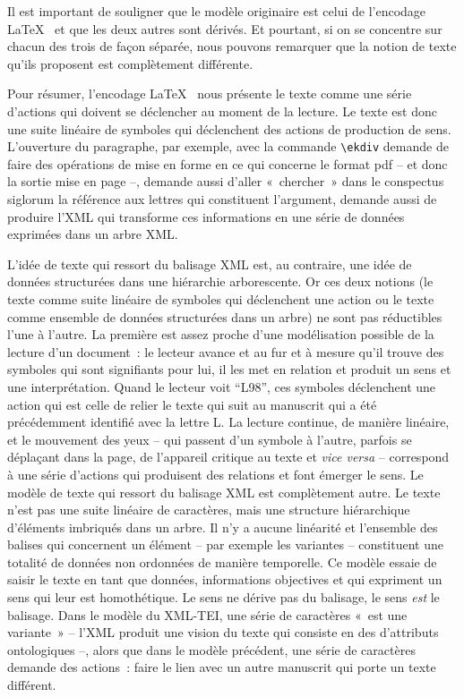 Il est important de souligner que le modèle originaire est celui de
l'encodage \LaTeX~ et que les deux autres sont dérivés. Et pourtant, si
on se concentre sur chacun des trois de façon séparée, nous pouvons
remarquer que la notion de texte qu'ils proposent est complètement
différente.

Pour résumer, l'encodage \LaTeX~ nous présente le texte comme une série
d'actions qui doivent se déclencher au moment de la lecture. Le texte
est donc une suite linéaire de symboles qui déclenchent des actions de
production de sens. L'ouverture du paragraphe, par exemple, avec la
commande \texttt{\textbackslash{}ekdiv} demande de faire des opérations
de mise en forme en ce qui concerne le format pdf -- et donc la sortie
mise en page --, demande aussi d'aller «~chercher~» dans le conspectus
siglorum la référence aux lettres qui constituent l'argument, demande
aussi de produire l'XML qui transforme ces informations en une série de
données exprimées dans un arbre XML.

L'idée de texte qui ressort du balisage XML est, au contraire, une idée
de données structurées dans une hiérarchie arborescente. Or ces deux
notions (le texte comme suite linéaire de symboles qui déclenchent une
action ou le texte comme ensemble de données structurées dans un arbre)
ne sont pas réductibles l'une à l'autre. La première est assez proche
d'une modélisation possible de la lecture d'un document~: le lecteur
avance et au fur et à mesure qu'il trouve des symboles qui sont
signifiants pour lui, il les met en relation et produit un sens et une
interprétation. Quand le lecteur voit ``L98'', ces symboles déclenchent
une action qui est celle de relier le texte qui suit au manuscrit qui a
été précédemment identifié avec la lettre L. La lecture continue, de
manière linéaire, et le mouvement des yeux -- qui passent d'un symbole à
l'autre, parfois se déplaçant dans la page, de l'appareil critique au
texte et \emph{vice versa} -- correspond à une série d'actions qui
produisent des relations et font émerger le sens. Le modèle de texte qui
ressort du balisage XML est complètement autre. Le texte n'est pas une
suite linéaire de caractères, mais une structure hiérarchique d'éléments
imbriqués dans un arbre. Il n'y a aucune linéarité et l'ensemble des
balises qui concernent un élément -- par exemple les variantes --
constituent une totalité de données non ordonnées de manière temporelle.
Ce modèle essaie de saisir le texte en tant que données, informations
objectives et qui expriment un sens qui leur est homothétique. Le sens
ne dérive pas du balisage, le sens \emph{est} le balisage. Dans le
modèle du XML-TEI, une série de caractères «~est une variante~» -- l'XML
produit une vision du texte qui consiste en des d'attributs ontologiques
--, alors que dans le modèle précédent, une série de caractères demande
des actions~: faire le lien avec un autre manuscrit qui porte un texte
différent.

